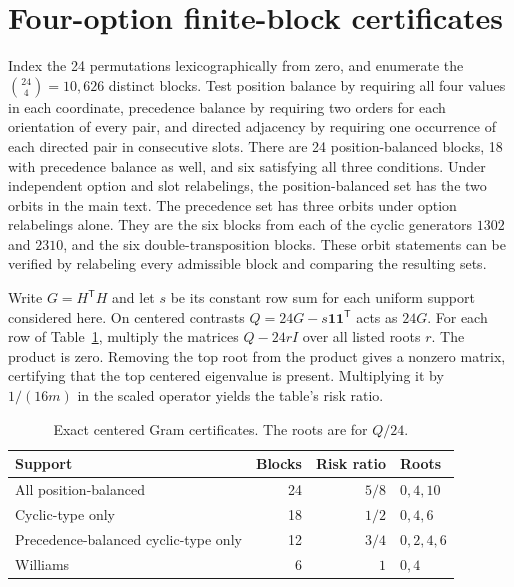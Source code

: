 



\section{Four-option finite-block certificates}
\label{app:certificates}

Index the 24 permutations lexicographically from zero, and enumerate
the \(\binom{24}{4}=10{,}626\) distinct blocks. Test position balance by
requiring all four values in each coordinate, precedence balance by requiring
two orders for each orientation of every pair, and directed adjacency
by requiring one occurrence of each directed pair in consecutive slots.
There are 24 position-balanced blocks, 18 with precedence balance as well,
and six satisfying all three conditions. Under independent option and
slot relabelings, the position-balanced set has the two orbits in
the main text. The precedence set has three orbits under option
relabelings alone. They are the six blocks from each of the cyclic
generators \(1302\) and \(2310\), and the six double-transposition
blocks. These orbit statements can be verified by relabeling every
admissible block and comparing the resulting sets.

Write \(G=H^{\mathsf T}H\) and let \(s\) be its constant row sum for
each uniform support considered here. On centered contrasts
\(Q=24G-s\mathbf{1}\mathbf{1}^{\mathsf T}\) acts as \(24G\).
For each row of Table~\ref{tab:roots}, multiply the matrices
\(Q-24rI\) over all listed roots \(r\). The product is zero. Removing
the top root from the product gives a nonzero matrix, certifying that the top
centered eigenvalue is present. Multiplying it by \(1/(16m)\) in
the scaled operator yields the table's risk ratio.

\begin{table}[h]
\centering
\caption{Exact centered Gram certificates. The roots are for \(Q/24\).}
\label{tab:roots}
\begin{tabular}{lrrl}
\toprule
Support & Blocks & Risk ratio & Roots \\
\midrule
All position-balanced & 24 & $5/8$ & $0,4,10$ \\
Cyclic-type only & 18 & $1/2$ & $0,4,6$ \\
Precedence-balanced cyclic-type only & 12 & $3/4$ & $0,2,4,6$ \\
Williams & 6 & $1$ & $0,4$ \\
\bottomrule
\end{tabular}
\end{table}

